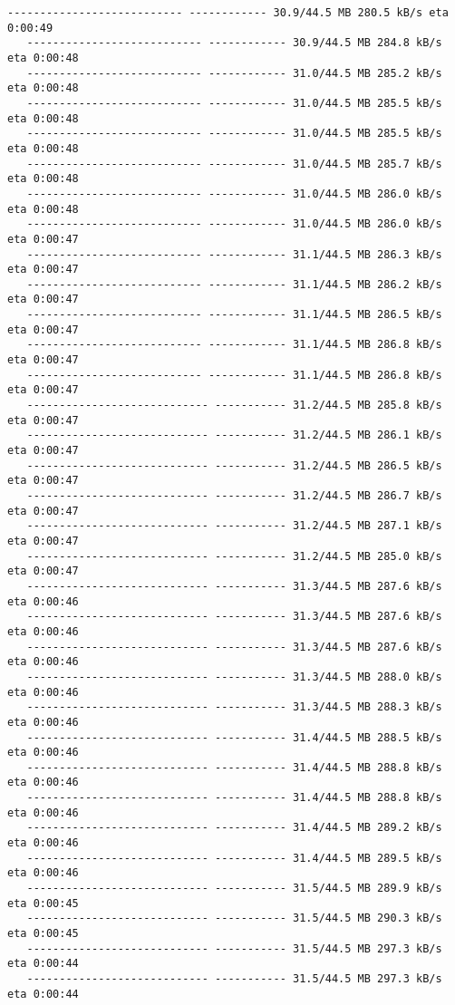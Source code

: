 \documentclass[11pt]{article}
\begin{document}
\begin{Verbatim}[commandchars=\\\{\}]
   --------------------------- ------------ 30.9/44.5 MB 280.5 kB/s eta 0:00:49
   --------------------------- ------------ 30.9/44.5 MB 284.8 kB/s eta 0:00:48
   --------------------------- ------------ 31.0/44.5 MB 285.2 kB/s eta 0:00:48
   --------------------------- ------------ 31.0/44.5 MB 285.5 kB/s eta 0:00:48
   --------------------------- ------------ 31.0/44.5 MB 285.5 kB/s eta 0:00:48
   --------------------------- ------------ 31.0/44.5 MB 285.7 kB/s eta 0:00:48
   --------------------------- ------------ 31.0/44.5 MB 286.0 kB/s eta 0:00:48
   --------------------------- ------------ 31.0/44.5 MB 286.0 kB/s eta 0:00:47
   --------------------------- ------------ 31.1/44.5 MB 286.3 kB/s eta 0:00:47
   --------------------------- ------------ 31.1/44.5 MB 286.2 kB/s eta 0:00:47
   --------------------------- ------------ 31.1/44.5 MB 286.5 kB/s eta 0:00:47
   --------------------------- ------------ 31.1/44.5 MB 286.8 kB/s eta 0:00:47
   --------------------------- ------------ 31.1/44.5 MB 286.8 kB/s eta 0:00:47
   ---------------------------- ----------- 31.2/44.5 MB 285.8 kB/s eta 0:00:47
   ---------------------------- ----------- 31.2/44.5 MB 286.1 kB/s eta 0:00:47
   ---------------------------- ----------- 31.2/44.5 MB 286.5 kB/s eta 0:00:47
   ---------------------------- ----------- 31.2/44.5 MB 286.7 kB/s eta 0:00:47
   ---------------------------- ----------- 31.2/44.5 MB 287.1 kB/s eta 0:00:47
   ---------------------------- ----------- 31.2/44.5 MB 285.0 kB/s eta 0:00:47
   ---------------------------- ----------- 31.3/44.5 MB 287.6 kB/s eta 0:00:46
   ---------------------------- ----------- 31.3/44.5 MB 287.6 kB/s eta 0:00:46
   ---------------------------- ----------- 31.3/44.5 MB 287.6 kB/s eta 0:00:46
   ---------------------------- ----------- 31.3/44.5 MB 288.0 kB/s eta 0:00:46
   ---------------------------- ----------- 31.3/44.5 MB 288.3 kB/s eta 0:00:46
   ---------------------------- ----------- 31.4/44.5 MB 288.5 kB/s eta 0:00:46
   ---------------------------- ----------- 31.4/44.5 MB 288.8 kB/s eta 0:00:46
   ---------------------------- ----------- 31.4/44.5 MB 288.8 kB/s eta 0:00:46
   ---------------------------- ----------- 31.4/44.5 MB 289.2 kB/s eta 0:00:46
   ---------------------------- ----------- 31.4/44.5 MB 289.5 kB/s eta 0:00:46
   ---------------------------- ----------- 31.5/44.5 MB 289.9 kB/s eta 0:00:45
   ---------------------------- ----------- 31.5/44.5 MB 290.3 kB/s eta 0:00:45
   ---------------------------- ----------- 31.5/44.5 MB 297.3 kB/s eta 0:00:44
   ---------------------------- ----------- 31.5/44.5 MB 297.3 kB/s eta 0:00:44

\end{Verbatim}
\end{document}
